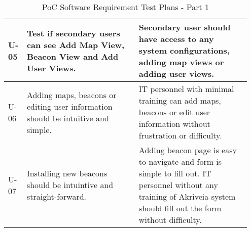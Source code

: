 \begin{table}[h!]
\begin{tabular}{|m{0.05\linewidth}|m{0.45\linewidth}|m{0.45\linewidth}|}
    U-05
    & Test if secondary users can see Add Map View, Beacon View and Add User Views.
    & Secondary user should have access to any system configurations, adding map views or adding user views.   \\ 
    \hline
    
    U-06
    & Adding maps, beacons or editing user information should be intuitive and simple.
    & IT personnel with minimal training can add maps, beacons or edit user information without frustration or difficulty.   \\ 
    \hline
   
    U-07
    & Installing new beacons should be intuintive and straight-forward.
    & Adding beacon page is easy to navigate and form is simple to fill out. IT personnel without any training 
    of Akriveia system should fill out the form without difficulty.   \\ 
    \hline

\end{tabular}
    \caption{PoC Software Requirement Test Plans - Part 1}
\end{table}

\pagebreak


